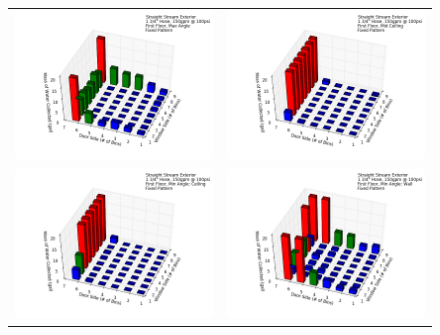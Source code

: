 \documentclass{article}
\begin{document}
\clearpage


\begin{figure}[ht]
\begin{tabular*}{\textwidth}{lr}
\includegraphics[width=3.2in]{../ADD_Analysis/Figures/15-12-08_113237_Datafile_Straight_Stream_Exterior.png} &
\includegraphics[width=3.2in]{../ADD_Analysis/Figures/15-12-08_114905_Datafile_Straight_Stream_Exterior.png} \\
\includegraphics[width=3.2in]{../ADD_Analysis/Figures/15-12-08_120311_Datafile_Straight_Stream_Exterior.png} &
\includegraphics[width=3.2in]{../ADD_Analysis/Figures/15-12-08_121011_Datafile_Straight_Stream_Exterior.png} \\

\end{tabular*}
\end{figure}
\end{document}
